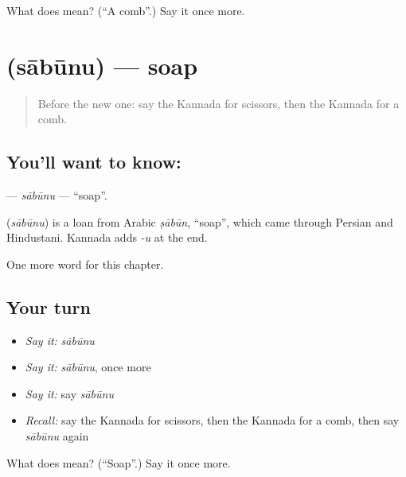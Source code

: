 \begin{tcolorbox}[breakable,colback=teal!4,colframe=teal!35!black,title={Before you move on}]
What does  mean? (\textquotedblleft{}A comb\textquotedblright{}.) Say it once more.
\end{tcolorbox}
\section[\texorpdfstring{\kn{ಸಾಬೂನು} (sābūnu)}{ಸಾಬೂನು (sābūnu)}]{ (sābūnu) — soap}

\label{lesson:KA-C117-sabunu}



\begin{quote}
Before the new one: say the Kannada for scissors, then the Kannada for a comb.
\end{quote}

\subsection*{You'll want to know: }
\textbf{} — \emph{sābūnu} — \textquotedblleft{}soap\textquotedblright{}.

\begin{cousinweb}
\textbf{} (\emph{sābūnu}) is a loan from Arabic \emph{ṣābūn}, \textquotedblleft{}soap\textquotedblright{}, which came through Persian and Hindustani. Kannada adds \emph{-u} at the end.
\end{cousinweb}

\begin{grammarlens}[title={What you've built}]
One more word for this chapter.
\end{grammarlens}

\subsection*{Your turn}
\begin{itemize}
\raggedright
  \item \emph{Say it:} \emph{sābūnu}
  \item \emph{Say it:} \emph{sābūnu}, once more
  \item \emph{Say it:} say \emph{sābūnu}
  \item \emph{Recall:} say the Kannada for scissors, then the Kannada for a comb, then say \emph{sābūnu} again
\end{itemize}

\begin{tcolorbox}[breakable,colback=teal!4,colframe=teal!35!black,title={Before you move on}]
What does  mean? (\textquotedblleft{}Soap\textquotedblright{}.) Say it once more.
\end{tcolorbox}
